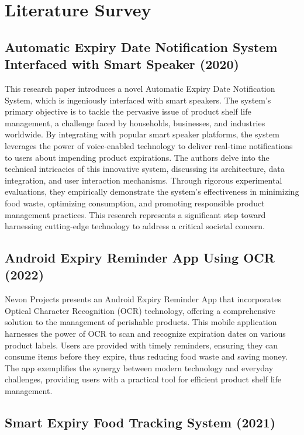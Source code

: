 \chapter{Literature Survey}

\section{Automatic Expiry Date Notification System Interfaced with Smart Speaker (2020)}

This research paper introduces a novel Automatic Expiry Date Notification System, which is ingeniously interfaced with smart speakers. The system's primary objective is to tackle the pervasive issue of product shelf life management, a challenge faced by households, businesses, and industries worldwide. By integrating with popular smart speaker platforms, the system leverages the power of voice-enabled technology to deliver real-time notifications to users about impending product expirations. The authors delve into the technical intricacies of this innovative system, discussing its architecture, data integration, and user interaction mechanisms. Through rigorous experimental evaluations, they empirically demonstrate the system's effectiveness in minimizing food waste, optimizing consumption, and promoting responsible product management practices. This research represents a significant step toward harnessing cutting-edge technology to address a critical societal concern.

\section{Android Expiry Reminder App Using OCR (2022)}

Nevon Projects presents an Android Expiry Reminder App that incorporates Optical Character Recognition (OCR) technology, offering a comprehensive solution to the management of perishable products. This mobile application harnesses the power of OCR to scan and recognize expiration dates on various product labels. Users are provided with timely reminders, ensuring they can consume items before they expire, thus reducing food waste and saving money. The app exemplifies the synergy between modern technology and everyday challenges, providing users with a practical tool for efficient product shelf life management.

\section{Smart Expiry Food Tracking System (2021)}

